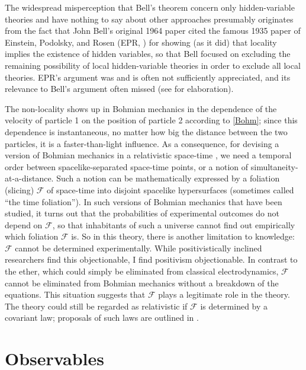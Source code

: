 \documentclass[12pt]{article}
\newcommand{\foliation}{\mathscr{F}}
\begin{document}
The widespread misperception that Bell's theorem concern only hidden-variable theories and have nothing to say about other approaches presumably originates from the fact that John Bell's original 1964 paper \cite{Bell64} cited the famous 1935 paper of Einstein, Podolsky, and Rosen (EPR, \cite{EPR}) for showing (as it did) that locality implies the existence of hidden variables, so that Bell focused on excluding the remaining possibility of local hidden-variable theories in order to exclude all local theories. EPR's argument was and is often not sufficiently appreciated, and its relevance to Bell's argument often missed (see \cite{GNTZ,Mau1} for elaboration).

The non-locality shows up in Bohmian mechanics in the dependence of the velocity of particle 1 on the position of particle 2 according to \eqref{Bohm}; since this dependence is instantaneous, no matter how big the distance between the two particles, it is a faster-than-light influence. As a consequence, for devising a version of Bohmian mechanics in a relativistic space-time \cite{HBD}, we need a temporal order between spacelike-separated space-time points, or a notion of simultaneity-at-a-distance. Such a notion can be mathematically expressed by a foliation (slicing) $\foliation$ of space-time into disjoint spacelike hypersurfaces (sometimes called ``the time foliation''). In such versions of Bohmian mechanics that have been studied, it turns out that the probabilities of experimental outcomes do not depend on $\foliation$, so that inhabitants of such a universe cannot find out empirically which foliation $\foliation$ is. So in this theory, there is another limitation to knowledge: $\foliation$ cannot be determined experimentally. While positivistically inclined researchers find this objectionable, I find positivism objectionable. In contrast to the ether, which could simply be eliminated from classical electrodynamics, $\foliation$ cannot be eliminated from Bohmian mechanics without a breakdown of the equations. This situation suggests that $\foliation$ plays a legitimate role in the theory. The theory could still be regarded as relativistic if $\foliation$ is determined by a covariant law; proposals of such laws are outlined in \cite{Tum07,DGNSZ14}.



\section{Observables}
\label{sec:observables}
\end{document}
